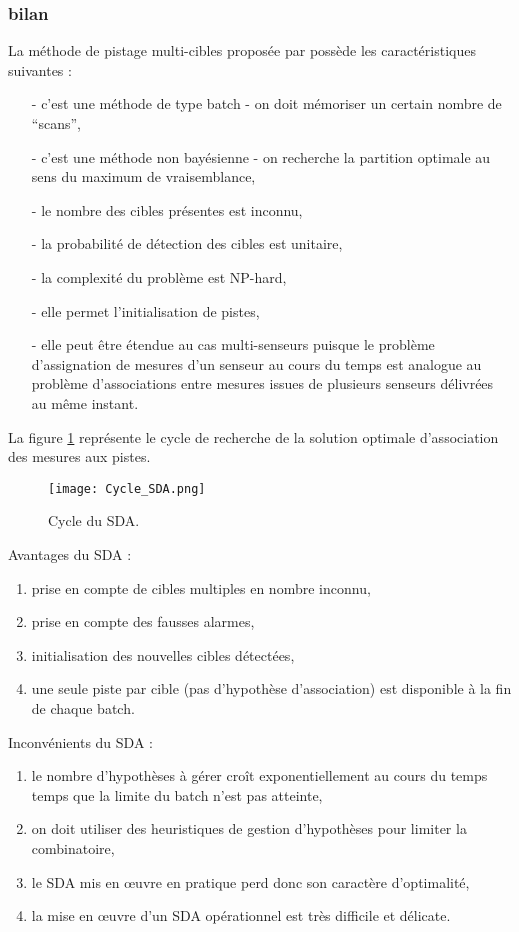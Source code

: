 \documentclass[10pt,french,a4paper]{report}
\begin{document}
\subsubsection{bilan}
La méthode de pistage multi-cibles proposée par \cite{Pattipati1992} possède les caractéristiques suivantes :
\begin{itemize}
\item[-]c'est une méthode de type batch - on doit mémoriser un certain nombre de ``scans'',
\item[-]c'est une méthode non bayésienne - on recherche la partition optimale au sens du maximum de vraisemblance,
\item[-]le nombre des cibles présentes est inconnu,
\item[-]la probabilité de détection des cibles est unitaire,
\item[-]la complexité du problème est NP-hard,
\item[-]elle permet l'initialisation de pistes,
\item[-]elle peut être étendue au cas multi-senseurs puisque le problème d'assignation de mesures d'un
senseur au cours du temps est analogue au problème d'associations entre mesures issues de plusieurs
senseurs délivrées au même instant.
\end{itemize}
La figure \ref{fig:SDA} représente le cycle de recherche de la solution optimale d'association des mesures aux pistes. 
\begin{center}
\begin{figure}
\label{fig:SDA}
\texttt{[image: Cycle\_SDA.png]} 
\caption{Cycle du \ac{SDA}.}
\end{figure}		 
\end{center}

 
Avantages du \ac{SDA} :
\begin{enumerate}[label=\arabic*.]
 \item prise en compte de cibles multiples en nombre inconnu,
 \item prise en compte des fausses alarmes,  
\item initialisation des nouvelles cibles détectées,
\item une seule piste par cible (pas d'hypothèse d'association) est disponible à la fin de chaque batch.
\end{enumerate}

Inconvénients du \ac{SDA} :
\begin{enumerate}[label=\arabic*.]
\item le nombre d'hypothèses à gérer croît exponentiellement au cours du temps temps que la limite du batch n'est pas atteinte,
\item on doit utiliser des heuristiques de gestion d'hypothèses pour limiter la combinatoire,
\item le \ac{SDA} mis en \oe uvre en pratique perd donc son caractère d'optimalité,
\item la mise en \oe uvre d'un \ac{SDA} opérationnel est très difficile et délicate.
\end{enumerate}
 
\end{document}
